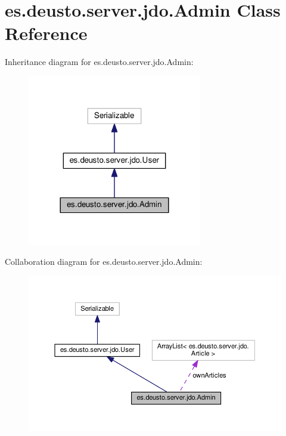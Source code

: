 \hypertarget{classes_1_1deusto_1_1server_1_1jdo_1_1_admin}{}\section{es.\+deusto.\+server.\+jdo.\+Admin Class Reference}
\label{classes_1_1deusto_1_1server_1_1jdo_1_1_admin}


Inheritance diagram for es.\+deusto.\+server.\+jdo.\+Admin\+:
\nopagebreak
\begin{figure}[H]
\begin{center}
\leavevmode
\includegraphics[width=216pt]{classes_1_1deusto_1_1server_1_1jdo_1_1_admin__inherit__graph}
\end{center}
\end{figure}


Collaboration diagram for es.\+deusto.\+server.\+jdo.\+Admin\+:
\nopagebreak
\begin{figure}[H]
\begin{center}
\leavevmode
\includegraphics[width=350pt]{classes_1_1deusto_1_1server_1_1jdo_1_1_admin__coll__graph}
\end{center}
\end{figure}

